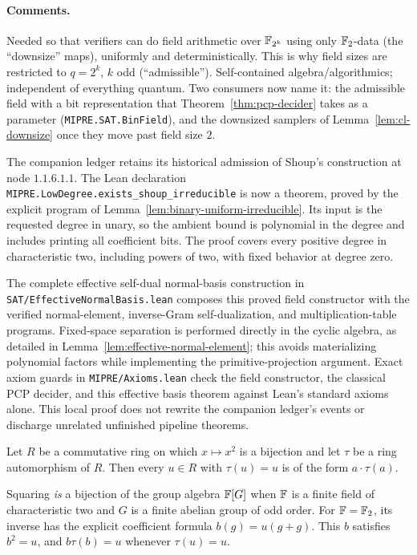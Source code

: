 \paragraph{Comments.} Needed so that verifiers can do field arithmetic over
$\mathbb{F}_{2^k}$ using only $\mathbb{F}_2$-data (the ``downsize'' maps), uniformly and
deterministically. This is why field sizes are restricted to $q = 2^k$, $k$ odd
(``admissible''). Self-contained algebra/algorithmics; independent of everything
quantum. Two consumers now name it: the admissible field with a bit representation that
Theorem~\ref{thm:pcp-decider} takes as a parameter (\texttt{MIPRE.SAT.BinField}), and the
downsized samplers of Lemma~\ref{lem:cl-downsize} once they move past field size $2$.

The companion ledger retains its historical admission of Shoup's construction at
node $1.1.6.1.1$. The Lean declaration
\texttt{MIPRE.LowDegree.exists\_shoup\_irreducible} is now a theorem, proved by the
explicit program of Lemma~\ref{lem:binary-uniform-irreducible}. Its input is the
requested degree in unary, so the ambient bound is polynomial in the degree and
includes printing all coefficient bits. The proof covers every positive degree
in characteristic two, including powers of two, with fixed behavior at degree zero.

The complete effective self-dual normal-basis construction in
\texttt{SAT/EffectiveNormalBasis.lean} composes this proved field constructor with
the verified normal-element, inverse-Gram self-dualization, and multiplication-table
programs. Fixed-space separation is performed directly in the cyclic algebra,
as detailed in Lemma~\ref{lem:effective-normal-element}; this avoids materializing
polynomial factors while implementing the primitive-projection argument.
Exact axiom guards in \texttt{MIPRE/Axioms.lean} check the field constructor, the
classical PCP decider, and this effective basis theorem against Lean's standard
axioms alone. This local proof does not rewrite the companion ledger's events or
discharge unrelated unfinished pipeline theorems.

\begin{lemma}
\label{lem:group-algebra-selfdualization}
\leanok
Let $R$ be a commutative ring on which $x \mapsto x^2$ is a bijection and let $\tau$ be a ring
automorphism of $R$. Then every $u \in R$ with $\tau(u) = u$ is of the form $a \cdot \tau(a)$.

Squaring \emph{is} a bijection of the group algebra $\mathbb{F}[G]$ when $\mathbb{F}$ is a finite field of
characteristic two and $G$ is a finite abelian group of odd order.
For $\mathbb{F}=\mathbb{F}_2$, its inverse has the explicit coefficient formula $b(g)=u(g+g)$.
This $b$ satisfies $b^2=u$, and $b\tau(b)=u$ whenever $\tau(u)=u$.
\end{lemma}

